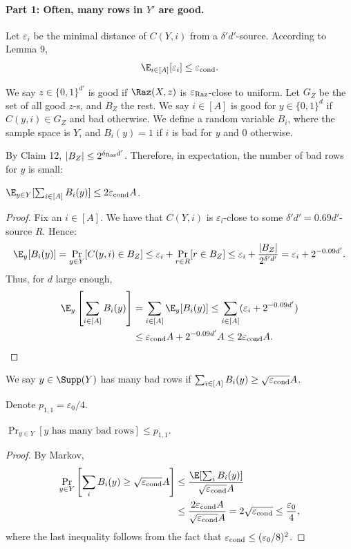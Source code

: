 \paragraph{Part 1: Often, many rows in $Y'$ are good.}
Let $\varepsilon_i$ be the minimal distance of $C(Y,i)$ from a $\delta'd'$-source. According to Lemma 9,
\[\E_{i\in[A]}[\varepsilon_i]\le\varepsilon_{\rm cond}.\]
\begin{definition}
We say $z\in\{0,1\}^{d'}$ is good if $\Raz(X,z)$ is $\varepsilon_{\rm Raz}$-close to uniform. Let $G_Z$ be the set of all good $z$-s, and $B_Z$ the rest. We say $i\in[A]$ is good for $y\in\{0,1\}^d$ if $C(y,i)\in G_Z$ and bad otherwise. We define a random variable $B_i$, where the sample space is $Y$, and $B_i(y)=1$ if $i$ is bad for $y$ and 0 otherwise.
\end{definition}
By Claim 12, $|B_Z|\le2^{\delta_{\rm Raz}d'}$. Therefore, in expectation, the number of bad rows for $y$ is small:
\begin{claim}$\E_{y\in Y}[\sum_{i\in[A]}B_i(y)]\le2\varepsilon_{\rm cond}A$.\end{claim}
\begin{proof}
Fix an $i\in[A]$. We have that $C(Y,i)$ is $\varepsilon_i$-close to some $\delta'd'=0.69d'$-source $R$. Hence:
\[\E_y[B_i(y)]=\Pr_{y\in Y}[C(y,i)\in B_Z]\le\varepsilon_i+\Pr_{r\in R}[r\in B_Z]\le\varepsilon_i+\frac{|B_Z|}{2^{\delta'd'}}=\varepsilon_i+2^{-0.09d'}.\]
Thus, for $d$ large enough,
\begin{align*}
\E_y\left[\sum_{i\in[A]}B_i(y)\right]&=\sum_{i\in[A]}\E_y[B_i(y)]\le\sum_{i\in[A]}(\varepsilon_i+2^{-0.09d'})\\
&\le\varepsilon_{\rm cond}A+2^{-0.09d'}A\le2\varepsilon_{\rm cond}A.
\end{align*}
\end{proof}
\begin{definition}
We say $y\in\Supp(Y)$ has many bad rows if $\sum_{i\in[A]}B_i(y)\ge\sqrt{\varepsilon_{\rm cond}}A$.
\end{definition}
Denote $p_{1,1}=\varepsilon_0/4$.
\begin{claim}$\Pr_{y\in Y}[y\text{ has many bad rows}]\le p_{1,1}$.\end{claim}
\begin{proof}
By Markov,
\begin{align*}
\Pr_{y\in Y}\left[\sum_iB_i(y)\ge\sqrt{\varepsilon_{\rm cond}}A\right]&\le\frac{\E[\sum_iB_i(y)]}{\sqrt{\varepsilon_{\rm cond}}A}\\
&\le\frac{2\varepsilon_{\rm cond}A}{\sqrt{\varepsilon_{\rm cond}}A}=2\sqrt{\varepsilon_{\rm cond}}\le\frac{\varepsilon_0}4,
\end{align*}
where the last inequality follows from the fact that $\varepsilon_{\rm cond}\le(\varepsilon_0/8)^2$.
\end{proof}
